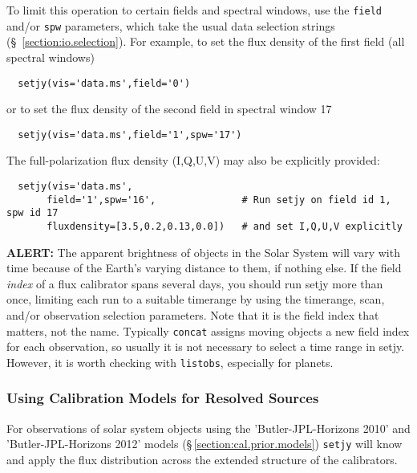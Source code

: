 To limit this operation to certain fields and spectral windows, use
the {\tt field} and/or {\tt spw} parameters, which take the usual
data selection strings (\S~\ref{section:io.selection}). For example, 
to set the flux density of the first field (all spectral windows)
\small
\begin{verbatim}
  setjy(vis='data.ms',field='0')
\end{verbatim}
\normalsize
or to set the flux density of the second field in spectral window 17
\small
\begin{verbatim}
  setjy(vis='data.ms',field='1',spw='17')
\end{verbatim}
\normalsize
The full-polarization flux density (I,Q,U,V) may also be explicitly provided:
\small
\begin{verbatim}
  setjy(vis='data.ms',
       field='1',spw='16',               # Run setjy on field id 1, spw id 17
       fluxdensity=[3.5,0.2,0.13,0.0])   # and set I,Q,U,V explicitly
\end{verbatim}
\normalsize


{\bf ALERT:} The apparent brightness of objects in the Solar System
will vary with time because of the Earth's varying distance to them,
if nothing else.  If the field {\it index} of a flux calibrator spans
several days, you should run setjy more than once, limiting each run
to a suitable timerange by using the timerange, scan, and/or
observation selection parameters.  Note that it is the field index
that matters, not the name.  Typically {\tt concat} assigns moving
objects a new field index for each observation, so usually it is not
necessary to select a time range in setjy.  However, it is worth
checking with {\tt listobs}, especially for planets.



\subsubsection{Using Calibration Models for Resolved Sources}
\label{section:cal.prior.models.resolved}

For observations of solar system objects using the
'Butler-JPL-Horizons 2010' and 'Butler-JPL-Horizons 2012' models
(\S\,\ref{section:cal.prior.models}) {\tt setjy} will know and apply
the flux distribution across the extended structure of the calibrators. 


